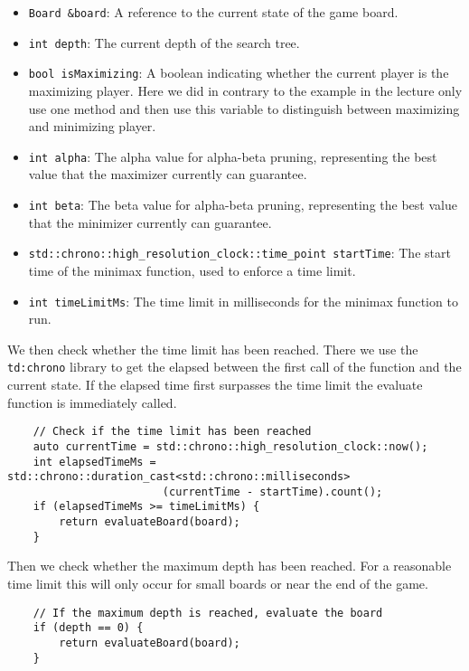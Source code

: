 \documentclass[a4paper,12pt]{article}
\begin{document}
\begin{itemize}
    \item \texttt{Board \&board}: A reference to the current state of the game board.
    \item \texttt{int depth}: The current depth of the search tree.
    \item \texttt{bool isMaximizing}: A boolean indicating whether the current player is the maximizing player. Here we did in contrary to the example in the lecture only use one method and then use this variable to distinguish between maximizing and minimizing player.
    \item \texttt{int alpha}: The alpha value for alpha-beta pruning, representing the best value that the maximizer currently can guarantee.
    \item \texttt{int beta}: The beta value for alpha-beta pruning, representing the best value that the minimizer currently can guarantee.
    \item \verb|std::chrono::high_resolution_clock::time_point startTime|: The start time of the minimax function, used to enforce a time limit.
    \item \verb|int timeLimitMs|: The time limit in milliseconds for the minimax function to run.
\end{itemize}

We then check whether the time limit has been reached. There we use 
the \texttt{td:chrono} library to get the elapsed between the first call of the function and the current state. If the elapsed time first surpasses 
the time limit the evaluate function is immediately called.
\begin{verbatim}
    // Check if the time limit has been reached
    auto currentTime = std::chrono::high_resolution_clock::now();
    int elapsedTimeMs = std::chrono::duration_cast<std::chrono::milliseconds>
                        (currentTime - startTime).count();
    if (elapsedTimeMs >= timeLimitMs) {
        return evaluateBoard(board);
    }
\end{verbatim}

Then we check whether the maximum depth has been reached. For a reasonable time limit this will only occur for small boards or near the end of the game.

\begin{verbatim}
    // If the maximum depth is reached, evaluate the board
    if (depth == 0) {
        return evaluateBoard(board);
    }
\end{verbatim}
\end{document}
